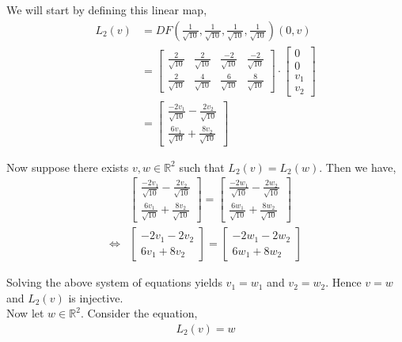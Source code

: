 \documentclass[12pt]{article}
\begin{document}
We will start by defining this linear map,
\begin{align*}
L_2(v) &= DF\left(\frac{1}{\sqrt{10}}, \frac{1}{\sqrt{10}}, \frac{1}{\sqrt{10}}, \frac{1}{\sqrt{10}}\right)(0, v)\\
&= \begin{bmatrix}
\frac{2}{\sqrt{10}} & \frac{2}{\sqrt{10}} & \frac{-2}{\sqrt{10}} & \frac{-2}{\sqrt{10}}\\
\frac{2}{\sqrt{10}} & \frac{4}{\sqrt{10}} & \frac{6}{\sqrt{10}} & \frac{8}{\sqrt{10}}
\end{bmatrix} \cdot \begin{bmatrix}
0\\
0\\
v_1\\
v_2
\end{bmatrix}\\
&= \begin{bmatrix}
\frac{-2v_1}{\sqrt{10}} - \frac{2v_2}{\sqrt{10}}\\
\frac{6v_1}{\sqrt{10}} + \frac{8v_2}{\sqrt{10}}
\end{bmatrix}
\end{align*}

Now suppose there exists $v, w \in \mathbb{R}^2$ such that $L_2(v) = L_2(w)$. Then we have,
\begin{align*}
&\begin{bmatrix}
\frac{-2v_1}{\sqrt{10}} - \frac{2v_2}{\sqrt{10}}\\
\frac{6v_1}{\sqrt{10}} + \frac{8v_2}{\sqrt{10}}
\end{bmatrix} = \begin{bmatrix}
\frac{-2w_1}{\sqrt{10}} - \frac{2w_2}{\sqrt{10}}\\
\frac{6w_1}{\sqrt{10}} + \frac{8w_2}{\sqrt{10}}
\end{bmatrix}\\
\iff &\begin{bmatrix}
-2v_1 - 2v_2\\
6v_1 + 8v_2
\end{bmatrix} = \begin{bmatrix}
-2w_1 - 2w_2\\
6w_1 + 8w_2
\end{bmatrix}
\end{align*}

Solving the above system of equations yields $v_1 = w_1$ and $v_2 = w_2$. Hence $v = w$ and $L_2(v)$ is injective.\\

Now let $w \in \mathbb{R}^2$. Consider the equation,
\begin{align*}
L_2(v) = w
\end{align*}
\end{document}
